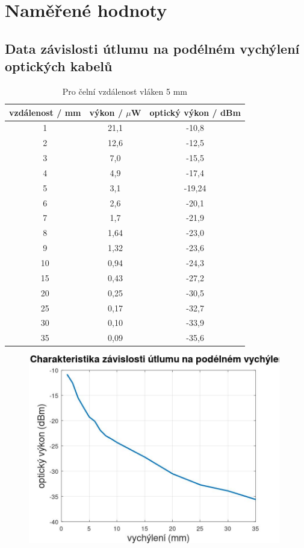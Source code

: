 
\section{Naměřené hodnoty}

\subsection{Data závislosti útlumu na podélném vychýlení optických kabelů}

\begin{table}[h!]

\caption{Pro čelní vzdálenost vláken 5 mm }
\centering
\begin{tabular}{ | c | c | c | } 
  \hline
  vzdálenost / mm & výkon / $\mu$W & optický výkon / dBm  \\ 
     \hline
   1 & 21,1 & -10,8\\ 
     \hline
   2 & 12,6 & -12,5\\ 
     \hline
   3 & 7,0 & -15,5\\ 
     \hline
   4 & 4,9 & -17,4\\ 
     \hline
   5  & 3,1 & -19,24\\ 
     \hline
   6  & 2,6 & -20,1\\ 
     \hline
   7  & 1,7 & -21,9\\ 
     \hline
   8  & 1,64 & -23,0\\ 
     \hline
   9  & 1,32 & -23,6\\ 
     \hline
   10  & 0,94 & -24,3\\ 
     \hline
   15  & 0,43 & -27,2\\ 
     \hline
   20  & 0,25 & -30,5\\ 
     \hline
   25  & 0,17 & -32,7\\ 
     \hline
   30  & 0,10 & -33,9\\ 
     \hline
   35 & 0,09 & -35,6\\ 
     \hline
\end{tabular}
\label{table:1}
\end{table}

\begin{figure}[h]
\centering
\includegraphics[width=11cm]{images/plot2.jpg}
\caption{}
\label{fig:12}
\end{figure}


